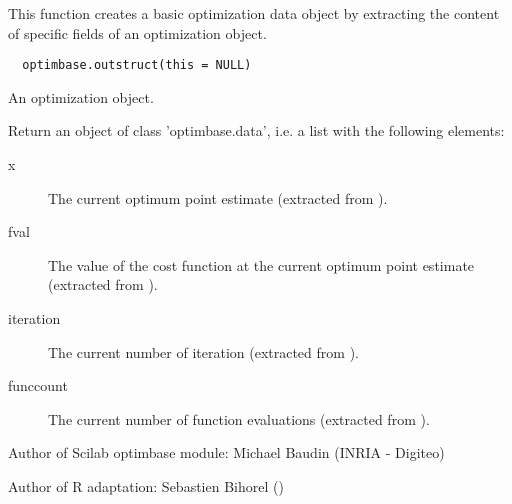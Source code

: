 %
\begin{Description}\relax
This function creates a basic optimization data object by extracting the
content of specific fields of an optimization object.
\end{Description}
%
\begin{Usage}
\begin{verbatim}
  optimbase.outstruct(this = NULL)
\end{verbatim}
\end{Usage}
%
\begin{Arguments}
\begin{ldescription}
\item[\code{this}] An optimization object.
\end{ldescription}
\end{Arguments}
%
\begin{Value}
Return an object of class 'optimbase.data', i.e. a list with the following 
elements: \begin{description}

\item[x] The current optimum point estimate (extracted from
).
\item[fval] The value of the cost function at the current optimum point
estimate (extracted from ).
\item[iteration] The current number of iteration (extracted
from ).
\item[funccount] The current number of function evaluations (extracted from
).

\end{description}

\end{Value}
%
\begin{Author}\relax
Author of Scilab optimbase module: Michael Baudin (INRIA - Digiteo)

Author of R adaptation: Sebastien Bihorel ()
\end{Author}
